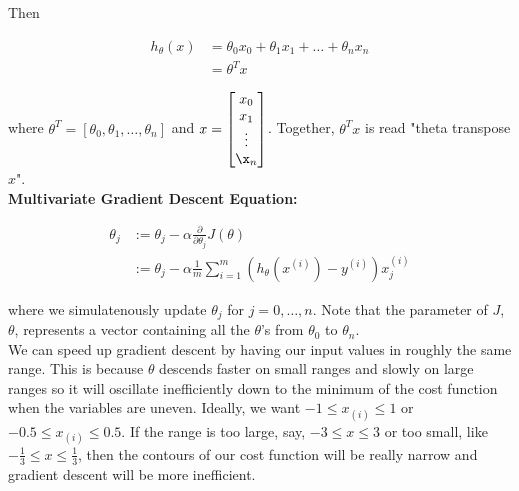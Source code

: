 \documentclass{article}
\begin{document}
        \noindent Then

        \begin{align*}
            h_{\theta}(x)   &= \theta_0 x_0 + \theta_1 x_1 + \dots + \theta_n x_n \\
                            &= \theta^T x
        \end{align*}

        \noindent where $\theta^T=[\theta_0,\theta_1,\dots,\theta_n]$ and
        $x=\begin{bmatrix}x_0\\x_1\\\vdots\\\x_n\end{bmatrix}$. Together, $\theta^T x$ is read
        "theta transpose $x$". \\

        \noindent \textbf{Multivariate Gradient Descent Equation:}

        \begin{align*}
            \theta_j &:= \theta_j-\alpha\frac{\partial}{\partial\theta_j}J(\theta) \\
                     &:= \theta_j-\alpha\frac{1}{m}\sum^m_{i=1}(h_\theta(x^{(i)})-y^{(i)})x_j^{(i)}
        \end{align*}

        \noindent where we simulatenously update $\theta_j$ for $j=0,\dots,n$. Note that the parameter of $J$,
        $\theta$, represents a vector containing all the $\theta$'s from $\theta_0$ to $\theta_n$. \\

        \noindent We can speed up gradient descent by having our input values in roughly the same range. This
        is because $\theta$ descends faster on small ranges and slowly on large ranges so it will oscillate
        inefficiently down to the minimum of the cost function when the variables are uneven. Ideally, we want
        $-1\leq x_{(i)}\leq 1$ or $-0.5\leq x_{(i)}\leq 0.5$. If the range is too large, say, $-3\leq x\leq 3$
        or too small, like $-\frac{1}{3}\leq x\leq\frac{1}{3}$, then the contours of our cost function will
        be really narrow and gradient descent will be more inefficient.
\end{document}
